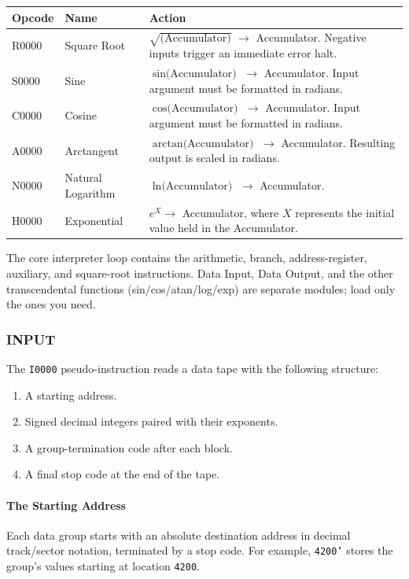\begin{table}[h]
\centering
\small
\ttfamily
\begin{tabularx}{\textwidth}{llX}
\toprule
\textbf{Opcode} & \textbf{Name} & \textbf{Action} \\ 
\midrule
R0000 & Square Root & $\sqrt{\text{(Accumulator)}}$ $\rightarrow$ Accumulator. Negative inputs trigger an immediate error halt. \\
S0000 & Sine & $\sin\text{(Accumulator)}$ $\rightarrow$ Accumulator. Input argument must be formatted in radians. \\
C0000 & Cosine & $\cos\text{(Accumulator)}$ $\rightarrow$ Accumulator. Input argument must be formatted in radians. \\
A0000 & Arctangent & $\arctan\text{(Accumulator)}$ $\rightarrow$ Accumulator. Resulting output is scaled in radians. \\
N0000 & Natural Logarithm & $\ln\text{(Accumulator)}$ $\rightarrow$ Accumulator. \\
H0000 & Exponential & $e^X \rightarrow$ Accumulator, where $X$ represents the initial value held in the Accumulator. \\
\bottomrule
\end{tabularx}
\end{table}

\bigskip
The core interpreter loop contains the arithmetic, branch, address-register, auxiliary, and square-root instructions. Data Input, Data Output, and the other transcendental functions (sin/cos/atan/log/exp) are separate modules; load only the ones you need.

\subsubsection*{INPUT}

The \texttt{I0000} pseudo-instruction reads a data tape with the following structure:
\begin{enumerate}
    \item A starting address.
    \item Signed decimal integers paired with their exponents.
    \item A group-termination code after each block.
    \item A final stop code at the end of the tape.
\end{enumerate}

\paragraph{The Starting Address}
Each data group starts with an absolute destination address in decimal track/sector notation, terminated by a stop code. For example, \texttt{4200'} stores the group's values starting at location \texttt{4200}.

